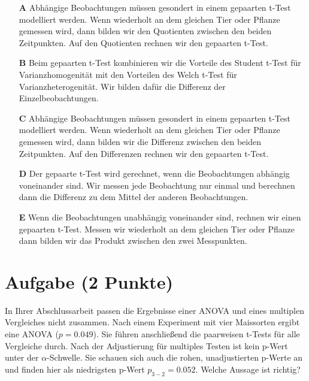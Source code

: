 \documentclass[a4paper, 9pt]{scrartcl}\usepackage[]{graphicx}\usepackage[]{xcolor}
\begin{document}
\begin{enumerate}
\item [\textbf{A} \msquare] Abhängige Beobachtungen müssen gesondert in einem gepaarten t-Test modelliert werden. Wenn wiederholt an dem gleichen Tier oder Pflanze gemessen wird, dann bilden wir den Quotienten zwischen den beiden Zeitpunkten. Auf den Quotienten rechnen wir den gepaarten t-Test.
\item [\textbf{B} \msquare] Beim gepaarten t-Test kombinieren wir die Vorteile des Student t-Test für Varianzhomogenität mit den Vorteilen des Welch t-Test für Varianzheterogenität. Wir bilden dafür die Differenz der Einzelbeobachtungen.
\item [\textbf{C} \msquare] Abhängige Beobachtungen müssen gesondert in einem gepaarten t-Test modelliert werden. Wenn wiederholt an dem gleichen Tier oder Pflanze gemessen wird, dann bilden wir die Differenz zwischen den beiden Zeitpunkten. Auf den Differenzen rechnen wir den gepaarten t-Test.
\item [\textbf{D} \msquare] Der gepaarte t-Test wird gerechnet, wenn die Beobachtungen abhängig voneinander sind. Wir messen jede Beobachtung nur einmal und berechnen dann die Differenz zu dem Mittel der anderen Beobachtungen.
\item [\textbf{E} \msquare] Wenn die Beobachtungen unabhängig voneinander sind, rechnen wir einen gepaarten t-Test. Messen wir wiederholt an dem gleichen Tier oder Pflanze dann bilden wir das Produkt zwischen den zwei Messpunkten.
\end{enumerate}

\section{Aufgabe \hfill (2 Punkte)}



In Ihrer Abschlussarbeit passen die Ergebnisse einer ANOVA und eines multiplen Vergleiches nicht zusammen. Nach einem Experiment mit vier Maissorten ergibt eine ANOVA ($p = 0.049$). Sie führen anschließend die paarweisen t-Tests für alle Vergleiche durch. Nach der Adjustierung für multiples Testen ist kein p-Wert unter der $\alpha$-Schwelle. Sie schauen sich auch die rohen, unadjustierten p-Werte an und finden hier als niedrigsten p-Wert $p_{3-2} = 0.052$. Welche Aussage ist richtig?
\end{document}
